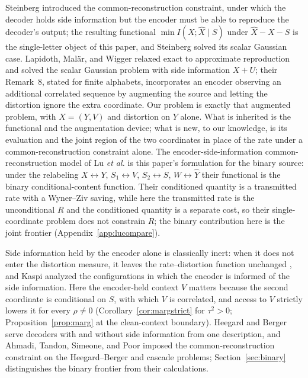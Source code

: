 \documentclass[11pt,onecolumn]{IEEEtran}
\newcommand{\hX}{\widehat{X}}
\newcommand{\hY}{\widehat{Y}}
\begin{document}
Steinberg \cite{steinberg2009} introduced the common-reconstruction
constraint, under which the decoder holds side information but the
encoder must be able to reproduce the decoder's output; the resulting
functional $\min I(X;\hX\mid S)$ under $\hX-X-S$ is the single-letter
object of this paper, and Steinberg solved its scalar Gaussian case.
Lapidoth, Mal\"ar, and Wigger \cite{lapidoth2014} relaxed exact to
approximate reproduction and solved the scalar Gaussian problem with
side information $X+U$; their Remark~8, stated for finite alphabets,
incorporates an encoder observing an additional correlated sequence by
augmenting the source and letting the distortion ignore the extra
coordinate. Our problem is exactly that augmented problem, with
$X=(Y,V)$ and distortion on $Y$ alone. What is inherited is the
functional and the augmentation device; what is new, to our knowledge,
is its evaluation and the joint region of the two coordinates in place
of the rate under a common-reconstruction constraint alone. The
encoder-side-information common-reconstruction model of Lu \emph{et al.}
\cite{lu2016lossy,lu2016binary} is this paper's formulation for the
binary source: under the relabeling $X\leftrightarrow Y$,
$S_1\leftrightarrow V$, $S_2\leftrightarrow S$, $W\leftrightarrow\hY$
their functional is the binary conditional-content function. Their
conditioned quantity is a transmitted rate with a Wyner--Ziv saving,
while here the transmitted rate is the unconditional $R$ and the
conditioned quantity is a separate cost, so their single-coordinate
problem does not constrain $R$; the binary contribution here is the
joint frontier (Appendix~\ref{app:lucompare}).

Side information held by the encoder alone is classically inert: when
it does not enter the distortion measure, it leaves the rate--distortion
function unchanged \cite{berger1971}, and Kaspi \cite{kaspi1994}
analyzed the configurations in which the encoder is informed of the
side information. Here the encoder-held context $V$ matters because the
second coordinate is conditional on $S$, with which $V$ is correlated,
and access to $V$ strictly lowers it for every $\rho\ne0$
(Corollary~\ref{cor:margstrict} for $\tau^2>0$;
Proposition~\ref{prop:marg} at the clean-context boundary). Heegard and Berger
\cite{heegardberger1985} serve decoders with and without side
information from one description, and Ahmadi, Tandon, Simeone, and
Poor \cite{ahmadi2013} imposed the common-reconstruction constraint on
the Heegard--Berger and cascade problems; Section~\ref{sec:binary}
distinguishes the binary frontier from their calculations.
\end{document}
